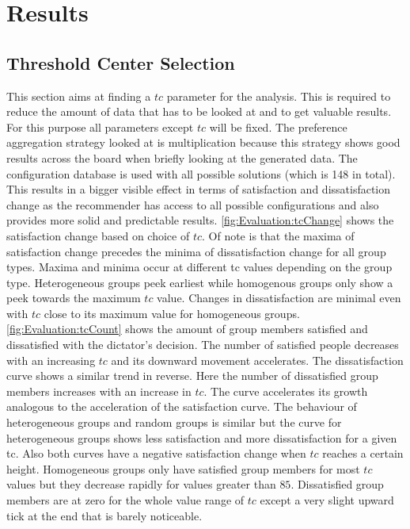 \section{Results}
\label{sec:Evaluation:Findings}

\subsection{Threshold Center Selection}
This section aims at finding a $tc$ parameter for the analysis. This is required to reduce the amount of data that has to be looked at and to get valuable results. For this purpose all parameters except $tc$ will be fixed. The preference aggregation strategy looked at is multiplication because this strategy shows good results across the board when briefly looking at the generated data. The configuration database is used with all possible solutions (which is 148 in total). This results in a bigger visible effect in terms of satisfaction and dissatisfaction change as the recommender has access to all possible configurations and also provides more solid and predictable results. \autoref{fig:Evaluation:tcChange} shows the satisfaction change based on choice of $tc$. Of note is that the maxima of satisfaction change precedes the minima of dissatisfaction change for all group types. Maxima and minima occur at different tc values depending on the group type. Heterogeneous groups peek earliest while homogenous groups only show a peek towards the maximum $tc$ value. Changes in dissatisfaction are minimal even with $tc$ close to its maximum value for homogeneous groups. \autoref{fig:Evaluation:tcCount} shows the amount of group members satisfied and dissatisfied with the dictator's decision. The number of satisfied people decreases with an increasing $tc$ and its downward movement accelerates. The dissatisfaction curve shows a similar trend in reverse. Here the number of dissatisfied group members increases with an increase in $tc$. The curve accelerates its growth analogous to the acceleration of the satisfaction curve. The behaviour of heterogeneous groups and random groups is similar but the curve for heterogeneous groups shows less satisfaction and more dissatisfaction for a given tc. Also both curves have a negative satisfaction change when $tc$ reaches a certain height. Homogeneous groups only have satisfied group members for most $tc$ values but they decrease rapidly for values greater than $85$. Dissatisfied group members are at zero for the whole value range of $tc$ except a very slight upward tick at the end that is barely noticeable.

